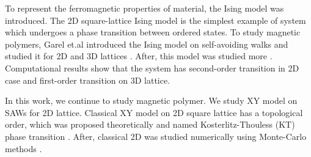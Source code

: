 To represent the ferromagnetic properties of material, the Ising model was introduced. The 2D square-lattice Ising model is the simplest example of system which undergoes a phase transition between ordered states. To study  magnetic polymers,  Garel et.al introduced the Ising model on self-avoiding walks \cite{Garel1999} and studied it for 2D and 3D lattices \cite{Garel1999, Papale2018}. After, this model was studied more \cite{PhysRevE.104.024122, PhysRevE.104.054501}. Computational results show that the system has second-order transition in 2D case and first-order transition on 3D lattice. 

In this work, we continue to study magnetic polymer. We study XY model on SAWs for 2D lattice. Classical XY model on 2D square lattice has a topological order, which was proposed theoretically and named Kosterlitz-Thouless (KT) phase transition \cite{Kosterlitz_1973}. After, classical 2D was studied numerically using Monte-Carlo methods \cite{xy2005, nikolaou2007matter}. 
 


